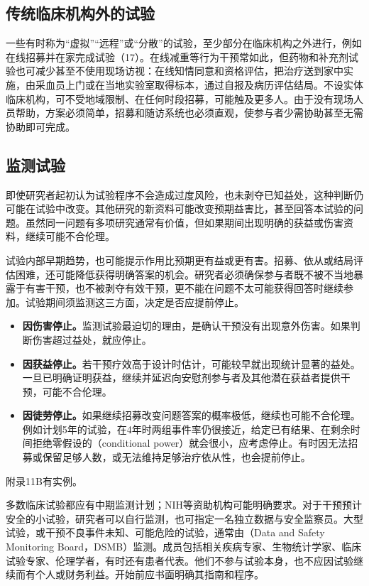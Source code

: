 \subsection{传统临床机构外的试验}
一些有时称为“虚拟”“远程”或“分散”的试验，至少部分在临床机构之外进行，例如在线招募并在家完成试验（17）。在线减重等行为干预常如此，但药物和补充剂试验也可减少甚至不使用现场访视：在线知情同意和资格评估，把治疗送到家中实施，由采血员上门或在当地实验室取得标本，通过自报及病历评估结局。不设实体临床机构，可不受地域限制、在任何时段招募，可能触及更多人。由于没有现场人员帮助，方案必须简单，招募和随访系统也必须直观，使参与者少需协助甚至无需协助即可完成。

\subsection{监测试验}
即使研究者起初认为试验程序不会造成过度风险，也未剥夺已知益处，这种判断仍可能在试验中改变。其他研究的新资料可能改变预期益害比，甚至回答本试验的问题。虽然同一问题有多项研究通常有价值，但如果期间出现明确的获益或伤害资料，继续可能不合伦理。

试验内部早期趋势，也可能提示作用比预期更有益或更有害。招募、依从或结局评估困难，还可能降低获得明确答案的机会。研究者必须确保参与者既不被不当地暴露于有害干预，也不被剥夺有效干预，更不能在问题不太可能获得回答时继续参加。试验期间须监测这三方面，决定是否应提前停止。
\begin{itemize}
\item \textbf{因伤害停止。}监测试验最迫切的理由，是确认干预没有出现意外伤害。如果判断伤害超过益处，就应停止。
\item \textbf{因获益停止。}若干预疗效高于设计时估计，可能较早就出现统计显著的益处。一旦已明确证明获益，继续并延迟向安慰剂参与者及其他潜在获益者提供干预，可能不合伦理。
\item \textbf{因徒劳停止。}如果继续招募改变问题答案的概率极低，继续也可能不合伦理。例如计划5年的试验，在4年时两组事件率仍很接近，给定已有结果、在剩余时间拒绝零假设的（conditional power）就会很小，应考虑停止。有时因无法招募或保留足够人数，或无法维持足够治疗依从性，也会提前停止。
\end{itemize}
附录11B有实例。

多数临床试验都应有中期监测计划；NIH等资助机构可能明确要求。对于干预预计安全的小试验，研究者可以自行监测，也可指定一名独立数据与安全监察员。大型试验，或干预不良事件未知、可能危险的试验，通常由（Data and Safety Monitoring Board，DSMB）监测。成员包括相关疾病专家、生物统计学家、临床试验专家、伦理学者，有时还有患者代表。他们不参与试验本身，也不应因试验继续而有个人或财务利益。开始前应书面明确其指南和程序。

